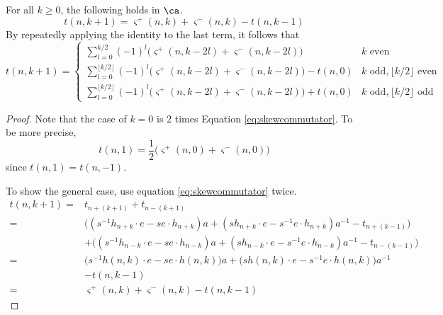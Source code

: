 \begin{lemma} \label{lemma:skewcommutatordecomp}
For all $k \geq 0$, the following holds in $\ca$.
\[
t(n, k+1) =  \varsigma^+ (n, k) + \varsigma^- (n, k) - t(n, k-1)
\]
By repeatedly applying the identity to the last term, it follows that
\[
t(n, k+1) = 
\begin{cases}
\sum_{l = 0}^{ k / 2 } (-1)^l \big( \varsigma^+ (n, k-2l) + \varsigma^- (n, k-2l) \big) & k \textrm{ even}\\
\sum_{l = 0}^{ \lfloor k / 2 \rfloor } (-1)^l \big( \varsigma^+ (n, k-2l) + \varsigma^- (n, k-2l) \big) - t(n, 0) & k \textrm{ odd}, \lfloor k/2 \rfloor \textrm{ even}\\
\sum_{l = 0}^{ \lfloor k / 2 \rfloor } (-1)^l \big( \varsigma^+ (n, k-2l) + \varsigma^- (n, k-2l) \big) + t(n, 0) & k \textrm{ odd}, \lfloor k/2 \rfloor \textrm{ odd}
\end{cases}
\]
\end{lemma}
\begin{proof}
Note that the case of $k=0$ is $2$ times Equation \eqref{eq:skewcommutator}. To be more precise, 
\[
t(n, 1) =  \frac{1}{2} \big( \varsigma^+ (n, 0) + \varsigma^- (n, 0) \big)
\]
since $t(n, 1) = t(n, -1)$. 

To show the general case, use equation \eqref{eq:skewcommutator} twice.
\begin{align*}
t(n, k+1)
= & t_{n+(k+1)} + t_{n-(k+1)} \\
= & \big( ( s^{-1} h_{n+k} \cdot e - s e \cdot h_{n+k} ) a + ( s h_{n+k} \cdot e - s^{-1} e \cdot h_{n+k} ) a^{-1} - t_{n+(k-1)} \big) \\
& + \big( ( s^{-1} h_{n-k} \cdot e - s e \cdot h_{n-k} ) a + ( s h_{n-k} \cdot e - s^{-1} e \cdot h_{n-k} ) a^{-1} - t_{n-(k-1)} \big) \\
= & \big( s^{-1} h(n, k) \cdot e - s e \cdot h(n, k) \big) a + \big( s h(n, k) \cdot e - s^{-1} e \cdot h(n, k) \big) a^{-1} \\
& - t(n, k-1) \\
= & \varsigma^+ (n, k) + \varsigma^- (n, k) - t(n, k-1)
\end{align*}
\end{proof}

